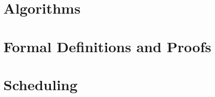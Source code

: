 \documentclass[sigconf, anonymous]{acmart}
\begin{document}



\appendix

\section{Algorithms}
\label{sec:algorithms}


\section{Formal Definitions and Proofs}
\label{sec:proof}


\section{Scheduling}
\label{sec:scheduling}

\end{document}
